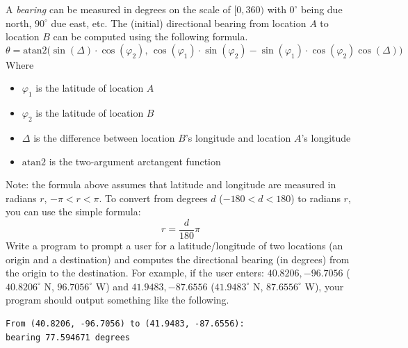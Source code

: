 \begin{exer}
A \emph{bearing} can be measured in degrees on the scale 
of $[0, 360)$ with $0^\circ$ being due north, $90^\circ$ due 
east, etc.  The (initial) directional bearing from location $A$ 
to location $B$ can be computed using the following formula.
$$\theta = \mathrm{atan2}\big(\sin(\Delta) \cdot \cos(\varphi_2), \, \cos(\varphi_1)\cdot\sin(\varphi_2) - \sin(\varphi_1)\cdot \cos(\varphi_2) \cos(\Delta)\big)$$
Where
\begin{itemize}
  \item $\varphi_1$ is the latitude of location $A$
  \item $\varphi_2$ is the latitude of location $B$
  \item $\Delta$ is the difference between location $B$'s longitude 
  	and location $A$'s longitude
  \item $\textrm{atan2}$ is the two-argument arctangent function
\end{itemize}
Note: the formula above assumes that latitude and longitude 
are measured in radians $r$, $-\pi < r < \pi$.  To convert from 
degrees $d$ ($-180 < d < 180$) to radians $r$, you can use the 
simple formula:
  $$r = \frac{d}{180} \pi$$
Write a program to prompt a user for a latitude/longitude of two 
locations (an origin and a destination) and computes the directional
bearing (in degrees) from the origin to the destination.  For example, if
the user enters: $40.8206, -96.7056$ ($40.8206^\circ$ N, $96.7056^\circ$ W)
and $41.9483, -87.6556$ ($41.9483^\circ$ N, $87.6556^\circ$ W), your
program should output something like the following.

\begin{verbatim}
From (40.8206, -96.7056) to (41.9483, -87.6556): 
bearing 77.594671 degrees
\end{verbatim}
\end{exer}


